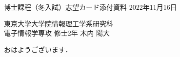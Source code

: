 \documentclass[a4paper]{jsarticle}
\begin{document}
\begin{flushleft}
  博士課程（冬入試）志望カード添付資料
  \hspace{\fill}
  2022年11月16日
\end{flushleft}

\begin{flushright}
  東京大学大学院情報理工学系研究科\\
  電子情報学専攻 修士2年 木内 陽大
\end{flushright}

おはようございます．
\end{document}
